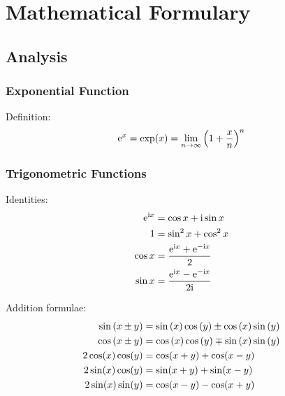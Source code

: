 \section{Mathematical Formulary}
	\subsection{Analysis}
		\subsubsection{Exponential Function}
			\noindent
			Definition:
			\begin{equation}
				\mathrm{e}^x=\exp(x)=\lim_{n\rightarrow \infty}\qty(1+\frac{x}{n})^n
			\end{equation}

		\subsubsection{Trigonometric Functions}
			\noindent
			Identities:
			\begin{equation}
				\begin{split}
					\mathrm{e}^{\mathrm{i} x}&=\cos x+\mathrm{i}\sin x \\
					1&=\sin^{2}x+\cos^{2}x \\
					\cos{x}&=\frac{\mathrm{e}^{\mathrm{i} x}+\mathrm{e}^{-\mathrm{i} x}}{2} \\
					\sin{ x}&=\frac{\mathrm{e}^{\mathrm{i} x}-\mathrm{e}^{-\mathrm{i} x}}{2\mathrm{i}} \\
				\end{split}
			\end{equation}

			\noindent
			Addition formulae:
			\begin{equation}
				\begin{split}
					\sin\qty( x\pm y)&=\sin\qty(x)\cos\qty(y)\pm\cos\qty(x) \sin\qty(y) \\
					\cos\qty( x\pm y)&=\cos\qty(x)\cos\qty(y)\mp\sin\qty(x) \sin\qty(y) \\
					2 \cos(x) \cos(y) &= \cos(x + y) + \cos(x - y) \\
					2 \sin(x) \cos(y) &= \sin(x + y) + \sin(x - y) \\
					2 \sin(x) \sin(y) &= \cos(x - y) - \cos(x + y) \\
				\end{split}
			\end{equation}


